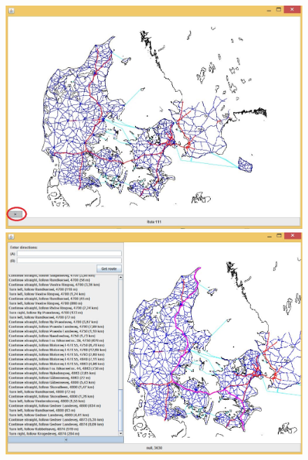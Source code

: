 \begin{figure}
\centering
\begin{minipage}{.5\textwidth}
  \centering
	\includegraphics[width=(\textwidth)/2]{brugervejledning/halvrenkort}
  \end{minipage}%
\begin{minipage}{.5\textwidth}
  \centering
\includegraphics[width=(\textwidth)/2]{brugervejledning/klikkort}
\end{minipage}
\end{figure}
